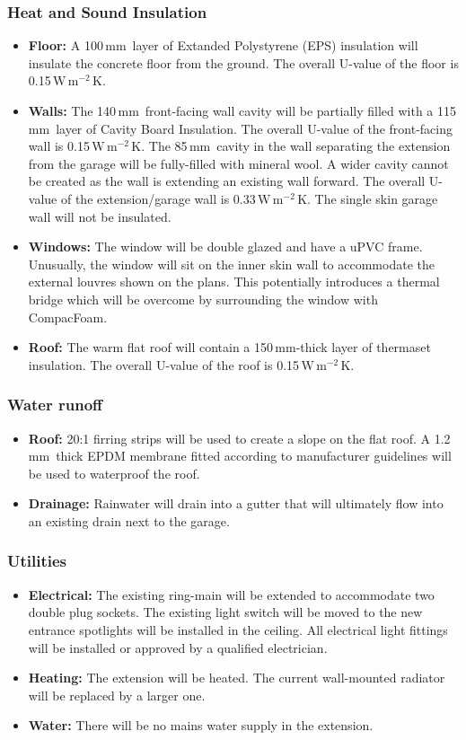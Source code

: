 \documentclass{extension}
\newcommand{\mm}{\,$\mathrm{mm}$}
\newcommand{\uunit}{\,$\mathrm{W\,m^{-2}\,K}$}
\begin{document}
\subsubsection{Heat and Sound Insulation}
\begin{itemize}
  \item {\bf Floor:} A 100\mm\ layer of Extanded Polystyrene (EPS)\cite{efins} insulation will insulate the concrete floor from the ground. The overall U-value of the floor is 0.15\uunit .
  \item {\bf Walls:} The 140\mm\ front-facing wall cavity will be partially filled with a 115\mm\ layer of Cavity Board Insulation.\cite{ew1ins} The overall U-value of the front-facing wall is 0.15\uunit . The 85\mm\ cavity in the wall separating the extension from the garage will be fully-filled with mineral wool.\cite{ew2ins} A wider cavity cannot be created as the wall is extending an existing wall forward. The overall U-value of the extension/garage wall is 0.33\uunit. The single skin garage wall will not be insulated.
  \item {\bf Windows:} The window will be double glazed and have a uPVC frame. Unusually, the window will sit on the inner skin wall to accommodate the external louvres shown on the plans. This potentially introduces a thermal bridge which will be overcome by surrounding the window with CompacFoam.\cite{cfoam}
  \item {\bf Roof:} The warm flat roof will contain a 150\mm -thick layer of thermaset insulation.\cite{erins} The overall U-value of the roof is 0.15\uunit .
\end{itemize}
\subsubsection{Water runoff}
\begin{itemize}
  \item {\bf Roof:} 20:1 firring strips will be used to create a slope on the flat roof. A 1.2\mm\ thick EPDM membrane\cite{prmem} fitted according to manufacturer guidelines will be used to waterproof the roof.
  \item {\bf Drainage:} Rainwater will drain into a gutter that will ultimately flow into an existing drain next to the garage.
\end{itemize}
\subsubsection{Utilities}
\begin{itemize}
  \item {\bf Electrical:} The existing ring-main will be extended to accommodate two double plug sockets. The existing light switch will be moved to the new entrance spotlights will be installed in the ceiling. All electrical light fittings will be installed or approved by a qualified electrician.
  \item {\bf Heating:} The extension will be heated. The current wall-mounted radiator will be replaced by a larger one.
  \item {\bf Water:} There will be no mains water supply in the extension.
\end{itemize}
\end{document}
